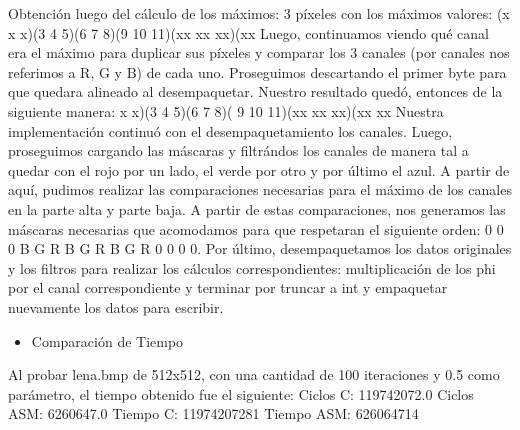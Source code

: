 \documentclass[10pt, a4paper]{article}
\begin{document}
\begin{itemize}
Obtención luego del cálculo de los máximos: 3 píxeles con los máximos valores:\newline
		(x x x)(3 4 5)(6  7  8)(9 10 11)(xx xx xx)(xx\newline
\newline
Luego, continuamos viendo qué canal era el máximo para duplicar sus píxeles y comparar los 3 canales (por canales nos referimos a R, G y B) de cada uno. Proseguimos descartando el primer byte para que quedara alineado al desempaquetar. Nuestro resultado quedó, entonces de la siguiente manera:\newline
		x x)(3 4 5)(6  7  8)( 9 10 11)(xx xx xx)(xx xx\newline
		\newline
Nuestra implementación continuó con el desempaquetamiento los canales. Luego, proseguimos cargando las máscaras y filtrándos los canales de manera tal a quedar con el rojo por un lado, el verde por otro y por último el azul. A partir de aquí, pudimos realizar las comparaciones necesarias para el máximo de los canales en la parte alta y parte baja. A partir de estas comparaciones, nos generamos las máscaras necesarias que acomodamos para que respetaran el siguiente orden: 0 0 0 B G R B G R B G R 0 0 0 0.\newline
Por último, desempaquetamos los datos originales y los filtros para realizar los cálculos correspondientes: multiplicación de los phi por el canal correspondiente y terminar por truncar a int y empaquetar nuevamente los datos para escribir.
\begin{itemize}
\item{Comparación de Tiempo}
\end{itemize}
Al probar lena.bmp de 512x512, con una cantidad de 100 iteraciones y 0.5 como parámetro, el tiempo obtenido fue el siguiente:\newline
Ciclos C:                 119742072.0\newline
Ciclos ASM:               6260647.0\newline
\newline
Tiempo C:                 11974207281\newline
Tiempo ASM:               626064714\newline
\newline



\end{itemize}
\end{document}
